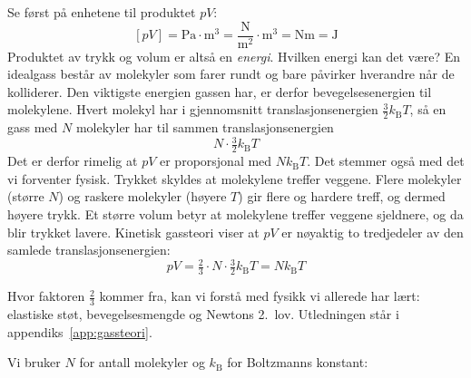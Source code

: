 Se først på enhetene til produktet $pV$:
\[
  [pV] = \si{\pascal}\cdot\si{\metre\cubed} = \frac{\si{\newton}}{\si{\metre\squared}}\cdot\si{\metre\cubed} = \si{\newton\metre} = \si{\joule}
\]
Produktet av trykk og volum er altså en \emph{energi}. Hvilken energi kan det være? En idealgass består av molekyler som farer rundt og bare påvirker hverandre når de kolliderer. Den viktigste energien gassen har, er derfor bevegelsesenergien til molekylene. Hvert molekyl har i gjennomsnitt translasjonsenergien $\tfrac{3}{2}k_\text{B}T$, så en gass med $N$ molekyler har til sammen translasjonsenergien
\[
  N\cdot\tfrac{3}{2}k_\text{B}T
\]
Det er derfor rimelig at $pV$ er proporsjonal med $Nk_\text{B}T$. Det stemmer også med det vi forventer fysisk. Trykket skyldes at molekylene treffer veggene. Flere molekyler (større $N$) og raskere molekyler (høyere $T$) gir flere og hardere treff, og dermed høyere trykk. Et større volum betyr at molekylene treffer veggene sjeldnere, og da blir trykket lavere. Kinetisk gassteori viser at $pV$ er nøyaktig to tredjedeler av den samlede translasjonsenergien:
\[
  pV = \tfrac{2}{3}\cdot N\cdot\tfrac{3}{2}k_\text{B}T = Nk_\text{B}T
\]

Hvor faktoren $\tfrac{2}{3}$ kommer fra, kan vi forstå med fysikk vi allerede har lært: elastiske støt, bevegelsesmengde og Newtons 2.\ lov. Utledningen står i appendiks~\ref{app:gassteori}.

Vi bruker $N$ for antall molekyler og $k_\text{B}$ for Boltzmanns konstant:





